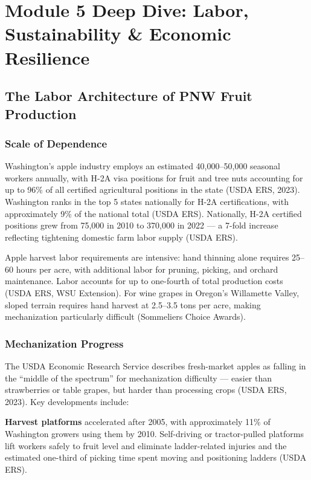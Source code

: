 \documentclass[11pt,letterpaper]{article}
\begin{document}
\section{Module 5 Deep Dive: Labor, Sustainability \& Economic Resilience}

\subsection{The Labor Architecture of PNW Fruit Production}

\subsubsection{Scale of Dependence}

Washington's apple industry employs an estimated 40,000--50,000 seasonal workers annually, with H-2A visa positions for fruit and tree nuts accounting for up to 96\% of all certified agricultural positions in the state (USDA ERS, 2023). Washington ranks in the top 5 states nationally for H-2A certifications, with approximately 9\% of the national total (USDA ERS). Nationally, H-2A certified positions grew from 75,000 in 2010 to 370,000 in 2022 --- a 7-fold increase reflecting tightening domestic farm labor supply (USDA ERS).

Apple harvest labor requirements are intensive: hand thinning alone requires 25--60 hours per acre, with additional labor for pruning, picking, and orchard maintenance. Labor accounts for up to one-fourth of total production costs (USDA ERS, WSU Extension). For wine grapes in Oregon's Willamette Valley, sloped terrain requires hand harvest at 2.5--3.5 tons per acre, making mechanization particularly difficult (Sommeliers Choice Awards).

\subsubsection{Mechanization Progress}

The USDA Economic Research Service describes fresh-market apples as falling in the ``middle of the spectrum'' for mechanization difficulty --- easier than strawberries or table grapes, but harder than processing crops (USDA ERS, 2023). Key developments include:

\textbf{Harvest platforms} accelerated after 2005, with approximately 11\% of Washington growers using them by 2010. Self-driving or tractor-pulled platforms lift workers safely to fruit level and eliminate ladder-related injuries and the estimated one-third of picking time spent moving and positioning ladders (USDA ERS).
\end{document}
